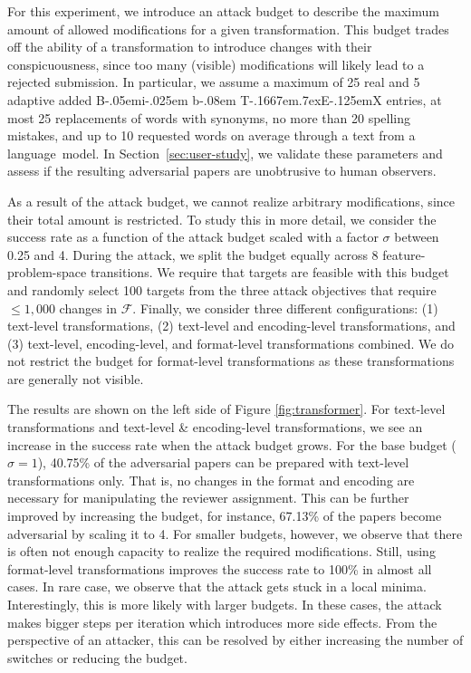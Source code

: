\documentclass[letterpaper,twocolumn,10pt]{article}
\def\BibTeX{{\rm B\kern-.05em{\sc i\kern-.025em b}\kern-.08em
    T\kern-.1667em\lower.7ex\hbox{E}\kern-.125emX}}
\newcommand{\attackbudgetscale}{\sigma}
\newcommand{\F}{\ensuremath{\mathcal{F}}\xspace}
\begin{document}
For this experiment, we introduce an attack budget to describe the maximum amount of allowed modifications for a given transformation. This budget trades off the ability of a transformation to introduce changes with their conspicuousness, since too many (visible) modifications will likely lead to a rejected submission. In particular, we assume a maximum of 25 real and 5 adaptive added \BibTeX{} entries, at most 25 replacements of words with synonyms, no more than 20 spelling mistakes, and up to 10 requested words on average through a text from a \mbox{language model}. In Section~\ref{sec:user-study}, we validate these parameters and assess if the resulting adversarial papers are unobtrusive to human observers.

As a result of the attack budget, we cannot realize arbitrary modifications, since their total amount is restricted. To study this in more detail, we consider the success rate as a function of the attack budget scaled with a factor $\attackbudgetscale$ between 0.25 and 4. During the attack, we split the budget equally across 8 feature-problem-space transitions. We require that targets are feasible with this budget and randomly select 100 targets from the three attack objectives that require $\leq 1,000$ changes in $\F$. Finally, we consider three different configurations: (1) text-level transformations, (2) text-level and encoding-level transformations, and (3) text-level, encoding-level, and format-level transformations combined. We do not restrict the budget for format-level transformations as these transformations are generally not visible.

The results are shown on the left side of Figure \ref{fig:transformer}. For text-level transformations and text-level \& encoding-level transformations, we see an increase in the success rate when the attack budget grows. For the base budget ($\sigma=1$), 40.75\% of the adversarial papers can be prepared with text-level transformations only. That is, no changes in the format and encoding are necessary for manipulating the reviewer assignment.
This can be further improved by increasing the budget, for instance, 67.13\% of the papers become adversarial by scaling it to 4. For smaller budgets, however, we observe that there is often not enough capacity to realize the required modifications. Still, using format-level transformations improves the success rate to 100\% in almost all cases. In rare case, we observe that the attack gets stuck in a local minima. Interestingly, this is more likely with larger budgets. In these cases, the attack makes {bigger\EndAccSupp{}} steps per iteration which introduces more side effects. From the perspective of an attacker, this can be {resolved\EndAccSupp{}} by either increasing the number of switches or reducing the budget.
\end{document}
